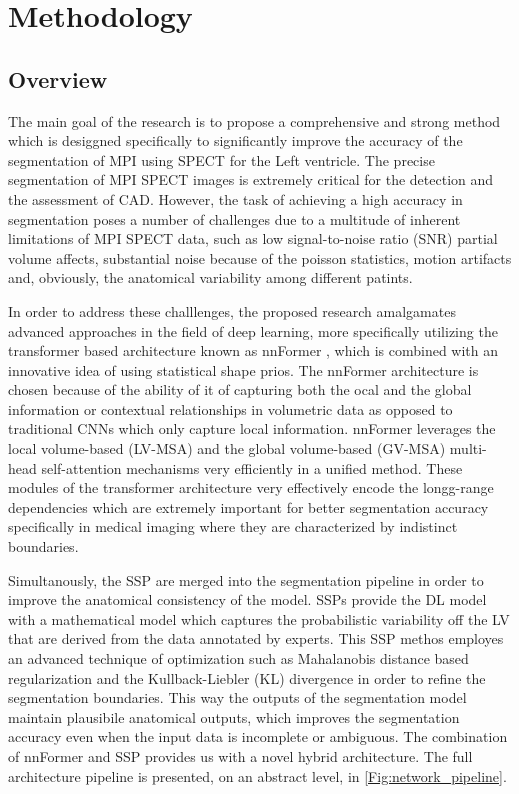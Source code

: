 \chapter{Methodology}
\label{ch:method}

\section{Overview}
The main goal of the research is to propose a comprehensive and strong method which is desiggned specifically to significantly improve the accuracy of the segmentation of MPI using SPECT for the Left ventricle. The precise segmentation of MPI SPECT images is extremely critical for the detection and the assessment of CAD. However, the task of achieving a high accuracy in segmentation poses a number of challenges due to a multitude of inherent limitations of MPI SPECT data, such as low signal-to-noise ratio (SNR) partial volume affects, substantial noise because of the poisson statistics, motion artifacts and, obviously, the anatomical variability among different patints. 

In order to address these challlenges, the proposed research amalgamates advanced approaches in the field of deep learning, more specifically utilizing the transformer based architecture known as nnFormer \cite{10.1109/TIP.2023.3293771}, which is combined with an innovative idea of using statistical shape prios. The nnFormer architecture is chosen because of the ability of it of capturing both the ocal and the global information or contextual relationships in volumetric data as opposed to traditional CNNs which only capture local information. nnFormer leverages the local volume-based (LV-MSA) and the global volume-based (GV-MSA) multi-head self-attention mechanisms very efficiently in a unified method. These modules of the transformer architecture very effectively encode the longg-range dependencies which are extremely important for better segmentation accuracy specifically in medical imaging where they are characterized by indistinct boundaries.

Simultanously, the SSP are merged into the segmentation pipeline in order to improve the anatomical consistency of the model. SSPs provide the DL model with a mathematical model which captures the probabilistic variability off the LV that are derived from the data annotated by experts. This SSP methos employes an advanced technique of optimization such as Mahalanobis distance based regularization and the Kullback-Liebler (KL) divergence in order to refine the segmentation boundaries. This way the outputs of the segmentation model maintain plausibile anatomical outputs, which improves the segmentation accuracy even when the input data is incomplete or ambiguous. The combination of nnFormer and SSP provides us with a novel hybrid architecture. The full architecture pipeline is presented, on an abstract level, in \cref{Fig:network_pipeline}.

